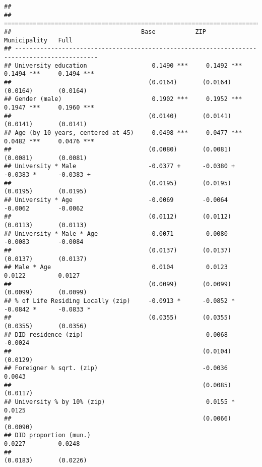 \documentclass[
]{article}
\begin{document}
\begin{verbatim}
## 
## =============================================================================================
##                                    Base           ZIP            Municipality   Full         
## ---------------------------------------------------------------------------------------------
## University education                  0.1490 ***     0.1492 ***     0.1494 ***     0.1494 ***
##                                      (0.0164)       (0.0164)       (0.0164)       (0.0164)   
## Gender (male)                         0.1902 ***     0.1952 ***     0.1947 ***     0.1960 ***
##                                      (0.0140)       (0.0141)       (0.0141)       (0.0141)   
## Age (by 10 years, centered at 45)     0.0498 ***     0.0477 ***     0.0482 ***     0.0476 ***
##                                      (0.0080)       (0.0081)       (0.0081)       (0.0081)   
## University * Male                    -0.0377 +      -0.0380 +      -0.0383 *      -0.0383 +  
##                                      (0.0195)       (0.0195)       (0.0195)       (0.0195)   
## University * Age                     -0.0069        -0.0064        -0.0062        -0.0062    
##                                      (0.0112)       (0.0112)       (0.0113)       (0.0113)   
## University * Male * Age              -0.0071        -0.0080        -0.0083        -0.0084    
##                                      (0.0137)       (0.0137)       (0.0137)       (0.0137)   
## Male * Age                            0.0104         0.0123         0.0122         0.0127    
##                                      (0.0099)       (0.0099)       (0.0099)       (0.0099)   
## % of Life Residing Locally (zip)     -0.0913 *      -0.0852 *      -0.0842 *      -0.0833 *  
##                                      (0.0355)       (0.0355)       (0.0355)       (0.0356)   
## DID residence (zip)                                  0.0068                       -0.0024    
##                                                     (0.0104)                      (0.0129)   
## Foreigner % sqrt. (zip)                             -0.0036                        0.0043    
##                                                     (0.0085)                      (0.0117)   
## University % by 10% (zip)                            0.0155 *                      0.0125    
##                                                     (0.0066)                      (0.0090)   
## DID proportion (mun.)                                               0.0227         0.0248    
##                                                                    (0.0183)       (0.0226)   

\end{verbatim}
\end{document}
